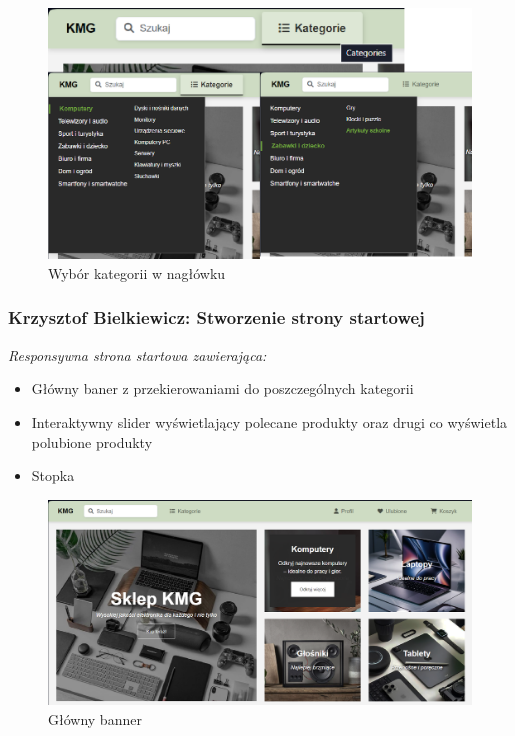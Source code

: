 \documentclass[12pt,a4paper,oneside]{article}
\theoremstyle{definition}
\numberwithin{equation}{section}
\begin{document}
\begin{figure}[H]
    \centering
    \includegraphics[width=0.9\columnwidth]{images/krzysztofBImages/header-categories.png}
    \caption{Wybór kategorii w nagłówku}
    \label{header-categories}
\end{figure}



\subsubsection{Krzysztof Bielkiewicz: Stworzenie strony startowej}
\label{1.3.2}
\textit{Responsywna strona startowa zawierająca:}
    \begin{itemize}
        \item Główny baner z przekierowaniami do poszczególnych kategorii
        \item Interaktywny slider wyświetlający polecane produkty oraz drugi co wyświetla polubione produkty
        \item Stopka
    \end{itemize}

    \begin{figure}[H]
        \centering
        \includegraphics[width=0.8\columnwidth]{images/krzysztofBImages/main-banner.png}
        \caption{Główny banner}
    \end{figure}
\end{document}
